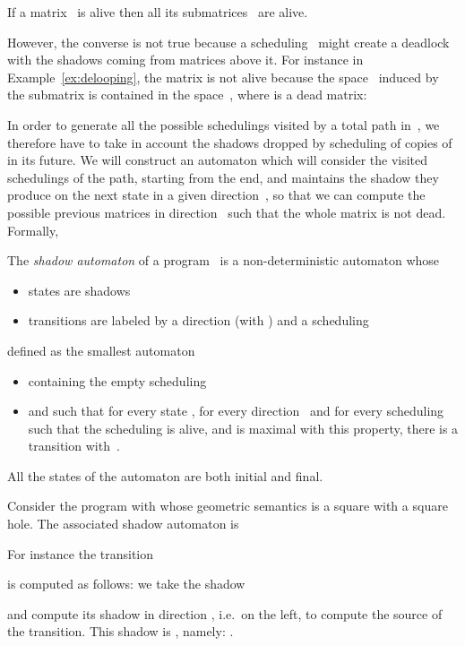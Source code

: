 \documentclass[orivec]{llncs} \usepackage[T1]{fontenc}
\newcommand{\ie}{i.e.~}
\begin{document}
\begin{lemma}
  If a matrix~ is alive then all its submatrices~ are alive.
\end{lemma}

\noindent
However, the converse is not true because a scheduling~ might create a
deadlock with the shadows coming from matrices above it. For instance in
Example~\ref{ex:delooping}, the matrix  is not alive because the
space~ induced by the submatrix  is contained in
the space~, where  is a dead matrix:
\vspace{-1ex}


In order to generate all the possible schedulings  visited by a total path
in~, we therefore have to take in account the shadows dropped by
scheduling of copies of~ in its future. We will construct an automaton
which will consider the visited schedulings of the path, starting from the end,
and maintains the shadow they produce on the next state in a given
direction~, so that we can compute the possible previous matrices in
direction~ such that the whole matrix is not dead. Formally,

\begin{definition}
  \label{shadow-automaton}
  The \emph{shadow automaton} of a program~ is a non-deterministic automaton
  whose
  \begin{itemize}
  \item states are shadows
  \item transitions  are labeled by a direction 
    (with ) and a scheduling~
  \end{itemize}
  defined as the smallest automaton
  \begin{itemize}
  \item containing the empty scheduling~
  \item and such that for every state , for every direction~ and for
    every scheduling~ such that the scheduling  is alive, and 
    is maximal with this property, there is a transition
     with~.
  \end{itemize}
  All the states of the automaton are both initial and final.
\end{definition}

\begin{example}
  \label{ex:shadow-automaton}
  Consider the program  with  whose geometric semantics is a
  square with a square hole. The associated shadow automaton is
  \vspace{-2ex}
  

  \vspace{-4ex}\noindent For instance the transition
  
  is computed as follows: we take the shadow
  
  and compute its shadow in direction , \ie on the left, to compute the
  source of the transition. This shadow is
  , namely:
  .
\end{example}
\end{document}
